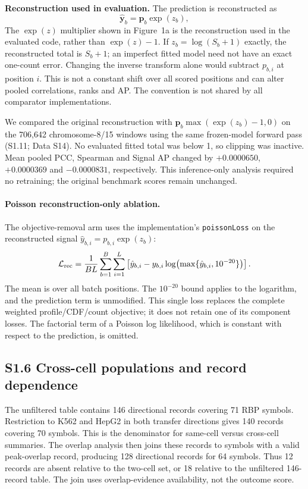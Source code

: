 \documentclass[11pt]{article}
\begin{document}
\textbf{Reconstruction used in evaluation.} The prediction is reconstructed as
\begin{equation}
\hat{\mathbf{y}}_b = \mathbf{p}_b \exp(z_b),
\label{eq:recon}
\end{equation}
The $\exp(z)$ multiplier shown in Figure~1a is the reconstruction used in the evaluated code, rather than $\exp(z)-1$. If $z_b=\log(S_b+1)$ exactly, the reconstructed total is $S_b+1$; an imperfect fitted model need not have an exact one-count error. Changing the inverse transform alone would subtract $p_{b,i}$ at position $i$. This is not a constant shift over all scored positions and can alter pooled correlations, ranks and AP. The convention is not shared by all comparator implementations.

We compared the original reconstruction with $\mathbf{p}_b\max(\exp(z_b)-1,0)$ on the 706,642 chromosome-8/15 windows using the same frozen-model forward pass (S1.11; Data S14). No evaluated fitted total was below 1, so clipping was inactive. Mean pooled PCC, Spearman and Signal AP changed by $+0.0000650$, $+0.0000369$ and $-0.0000831$, respectively. This inference-only analysis required no retraining; the original benchmark scores remain unchanged.

\paragraph{Poisson reconstruction-only ablation.} The objective-removal arm uses the implementation's \texttt{poissonLoss} on the reconstructed signal $\hat y_{b,i}=p_{b,i}\exp(z_b)$:
\begin{equation}
\mathcal L_{\rm rec}=\frac1{BL}\sum_{b=1}^{B}\sum_{i=1}^{L}
\left[\hat y_{b,i}-y_{b,i}\log\!\left(\max\{\hat y_{b,i},10^{-20}\}\right)\right].
\label{eq:supp_poisson_reconstruction}
\end{equation}
The mean is over all batch positions. The $10^{-20}$ bound applies to the logarithm, and the prediction term is unmodified. This single loss replaces the complete weighted profile/CDF/count objective; it does not retain one of its component losses. The factorial term of a Poisson log likelihood, which is constant with respect to the prediction, is omitted.

\subsection*{S1.6 Cross-cell populations and record dependence}

The unfiltered table contains 146 directional records covering 71 RBP symbols. Restriction to K562 and HepG2 in both transfer directions gives 140 records covering 70 symbols. This is the denominator for same-cell versus cross-cell summaries. The overlap analysis then joins these records to symbols with a valid peak-overlap record, producing 128 directional records for 64 symbols. Thus 12 records are absent relative to the two-cell set, or 18 relative to the unfiltered 146-record table. The join uses overlap-evidence availability, not the outcome score.
\end{document}

